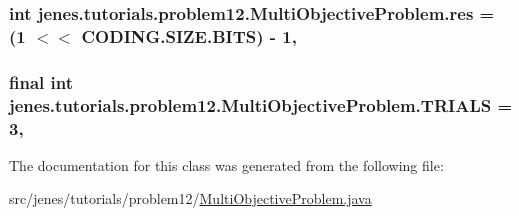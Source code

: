 \hypertarget{classjenes_1_1tutorials_1_1problem12_1_1_multi_objective_problem_ad61d16088d49c82c9e1a18619777ace8}{
\subsubsection[{res}]{\setlength{\rightskip}{0pt plus 5cm}int jenes.\-tutorials.\-problem12.\-Multi\-Objective\-Problem.\-res = (1 $<$$<$ C\-O\-D\-I\-N\-G.\-S\-I\-Z\-E.\-B\-I\-T\-S) -\/ 1\hspace{0.3cm}{\ttfamily [static]}, {\ttfamily [private]}}}\label{classjenes_1_1tutorials_1_1problem12_1_1_multi_objective_problem_ad61d16088d49c82c9e1a18619777ace8}
\hypertarget{classjenes_1_1tutorials_1_1problem12_1_1_multi_objective_problem_a3afefd11959f65c25c815b134439d091}{
\subsubsection[{T\-R\-I\-A\-L\-S}]{\setlength{\rightskip}{0pt plus 5cm}final int jenes.\-tutorials.\-problem12.\-Multi\-Objective\-Problem.\-T\-R\-I\-A\-L\-S = 3\hspace{0.3cm}{\ttfamily [static]}, {\ttfamily [private]}}}\label{classjenes_1_1tutorials_1_1problem12_1_1_multi_objective_problem_a3afefd11959f65c25c815b134439d091}


The documentation for this class was generated from the following file\-:\begin{DoxyCompactItemize}
\item 
src/jenes/tutorials/problem12/\hyperlink{problem12_2_multi_objective_problem_8java}{Multi\-Objective\-Problem.\-java}\end{DoxyCompactItemize}

